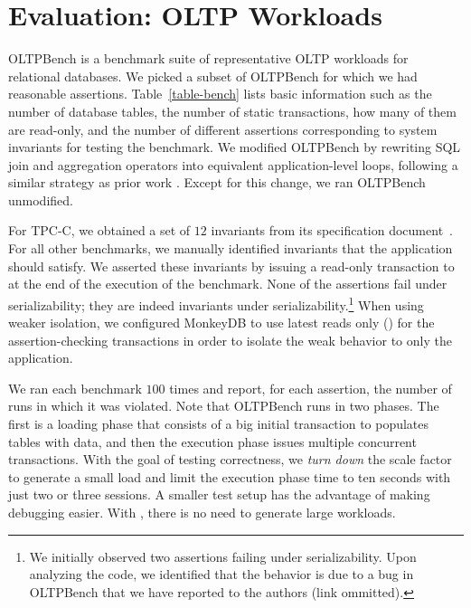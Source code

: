 
\section{Evaluation: OLTP Workloads}
\label{sec:oltp}

OLTPBench \cite{DBLP:journals/pvldb/DifallahPCC13} is a benchmark suite of representative 
OLTP workloads for relational databases.
We picked a subset of OLTPBench for which we had reasonable assertions. 
Table~\ref{table-bench} lists basic
information such as the number of database tables, the
number of static transactions, how many of them are read-only, and the number of
different assertions corresponding to system invariants for testing the benchmark. 
We modified OLTPBench by rewriting SQL join and aggregation
operators 
into equivalent application-level
loops, following a similar strategy as prior work \cite{DBLP:journals/pacmpl/RahmaniNDJ19}. Except for
this change, we ran OLTPBench unmodified. 

For TPC-C, we obtained a set of $12$ invariants from its specification
document~\cite{tpcc-spec}. For all other benchmarks, we manually identified 
invariants that the application should satisfy. We asserted these invariants 
by issuing a read-only transaction to \tool{} 
at the end of the execution of the benchmark. 
None of the assertions fail under serializability; they are indeed invariants
under serializability.\footnote{We initially observed two assertions failing
under serializability. Upon analyzing the code, we identified that the
behavior is due to a bug in OLTPBench that we have reported to the authors (link
ommitted).} 
When using weaker isolation, we configured MonkeyDB to use latest reads only
() for the assertion-checking transactions 
in order to isolate the weak behavior to only the application. 

We ran each benchmark $100$ times and report, for each assertion, the number of
runs in which it was violated. Note that OLTPBench runs in two phases. The first
is a loading phase that consists of a big initial transaction to populates tables 
with data, and then the execution phase issues multiple concurrent transactions. 
With the goal of testing correctness, we \textit{turn down} the scale factor to
generate a small load and limit the execution phase time to ten seconds with 
just two or three sessions. A smaller test setup has the advantage
of making debugging easier. With \tool{}, there is no need to generate large
workloads.

